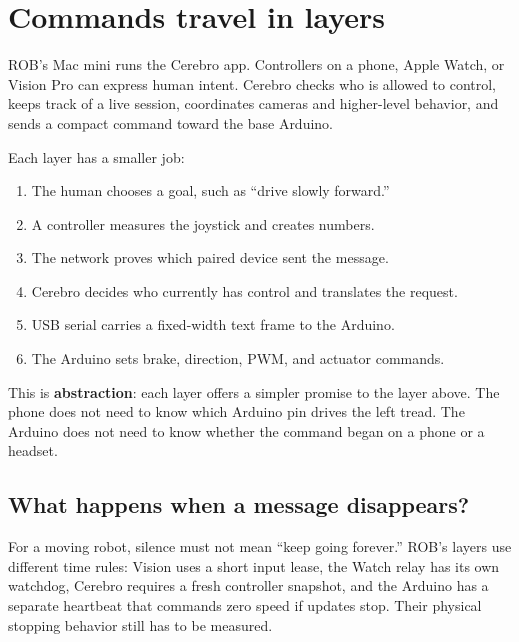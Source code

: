 \documentclass[11pt,openany]{book}
\begin{document}

\chapter{Commands travel in layers}

ROB's Mac mini runs the Cerebro app. Controllers on a phone, Apple Watch, or Vision Pro can express human intent. Cerebro checks who is allowed to control, keeps track of a live session, coordinates cameras and higher-level behavior, and sends a compact command toward the base Arduino.

\ROBControlStackDiagram

Each layer has a smaller job:

\begin{enumerate}
  \item The human chooses a goal, such as ``drive slowly forward.''
  \item A controller measures the joystick and creates numbers.
  \item The network proves which paired device sent the message.
  \item Cerebro decides who currently has control and translates the request.
  \item USB serial carries a fixed-width text frame to the Arduino.
  \item The Arduino sets brake, direction, PWM, and actuator commands.
\end{enumerate}

\begin{conceptbox}
This is \textbf{abstraction}: each layer offers a simpler promise to the layer above. The phone does not need to know which Arduino pin drives the left tread. The Arduino does not need to know whether the command began on a phone or a headset.
\end{conceptbox}

\clearpage
\section*{What happens when a message disappears?}

For a moving robot, silence must not mean ``keep going forever.'' ROB's layers use different time rules: Vision uses a short input lease, the Watch relay has its own watchdog, Cerebro requires a fresh controller snapshot, and the Arduino has a separate heartbeat that commands zero speed if updates stop. Their physical stopping behavior still has to be measured.
\end{document}
